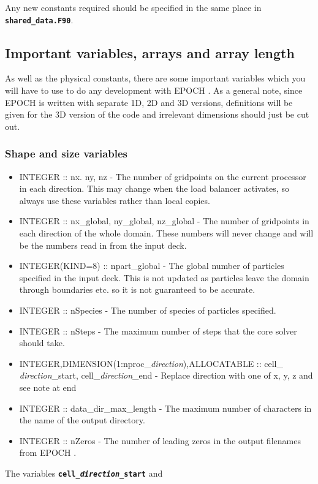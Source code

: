 \documentclass[12pt]{article}
\newcommand{\inlinecode}[1]{{\color{warwickred} \bf\texttt{#1}}}
\newcommand{\EPOCH}{{\color{warwickdark}\fontfamily{phv}\selectfont EPOCH} }
\begin{document}
Any new constants required should be specified in the same place in
\inlinecode{shared\_data.F90}.

\subsection{Important variables, arrays and array length}
As well as the physical constants, there are some important variables which
you will have to use to do any development with \EPOCH. As a general note,
since \EPOCH is written with separate 1D, 2D and 3D versions, definitions will
be given for the 3D version of the code and irrelevant dimensions should just
be cut out.

\subsubsection{Shape and size variables}
\begin{itemize}
\item INTEGER :: nx. ny, nz - The number of gridpoints on the current
  processor in each direction. This may change when the load balancer
  activates, so always use these variables rather than local copies.
\item INTEGER :: nx\_global, ny\_global, nz\_global - The number of gridpoints
  in each direction of the whole domain. These numbers will never change and
  will be the numbers read in from the input deck.
\item INTEGER(KIND=8) :: npart\_global - The global number of particles
  specified in the input deck. This is not updated as particles leave the
  domain through boundaries etc. so it is not guaranteed to be accurate.
\item INTEGER :: nSpecies - The number of species of particles specified.
\item INTEGER :: nSteps - The maximum number of steps that the core solver
  should take.
\item INTEGER,DIMENSION(1:nproc\_{\it direction}),ALLOCATABLE :: cell\_{\it
    direction}\_start, cell\_{\it direction}\_end - Replace direction with one
  of x, y, z and see note at end
\item INTEGER :: data\_dir\_max\_length - The maximum number of characters in
  the name of the output directory.
\item INTEGER :: nZeros - The number of leading zeros in the output filenames
  from \EPOCH.
\end{itemize}
The variables \inlinecode{cell\_{\it direction}\_start} and
\end{document}
